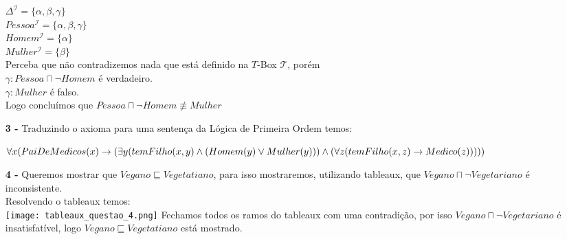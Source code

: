 \documentclass[12pt]{article}
\begin{document}
\begin{itemize}
			$\Delta^\mathcal{I} = \lbrace \alpha, \beta, \gamma \rbrace$\\
			$Pessoa^\mathcal{I} = \lbrace \alpha, \beta, \gamma \rbrace$\\
			$Homem^\mathcal{I} = \lbrace \alpha \rbrace$\\
			$Mulher^\mathcal{I} = \lbrace \beta \rbrace$\\
			
			Perceba que não contradizemos nada que está definido na $T$-Box $\mathcal{T}$,
			porém\\
			$\gamma: Pessoa \sqcap \neg Homem$ é verdadeiro.\\
			$\gamma: Mulher$ é falso.\\
			Logo concluímos que $Pessoa \sqcap \neg Homem \not\equiv Mulher$
			
		\item[\textbf{3 -}]
			\hfill\newline
			Traduzindo o axioma para uma sentença da Lógica de Primeira Ordem temos:\\
			
			\begin{footnotesize}
			$\forall x( PaiDeMedicos(x) \rightarrow \\ (\exists y(temFilho(x, y) \wedge (Homem(y) \vee Mulher(y))) \wedge (\forall z (temFilho(x, z) \rightarrow Medico(z)))))$
			\end{footnotesize}			
		\item[\textbf{4 -}]
			\hfill\newline
			Queremos mostrar que $Vegano \sqsubseteq Vegetatiano$, para isso mostraremos,
			utilizando tableaux, que $Vegano \sqcap \neg Vegetariano$ é inconsistente.\\
			Resolvendo o tableaux temos:\\
			\texttt{[image: tableaux\_questao\_4.png]}
			Fechamos todos os ramos do tableaux com uma contradição, por isso
			$Vegano \sqcap \neg Vegetariano$ é insatisfatível, logo $Vegano \sqsubseteq Vegetatiano$ 
			está mostrado.
	\end{itemize}
\end{document}

